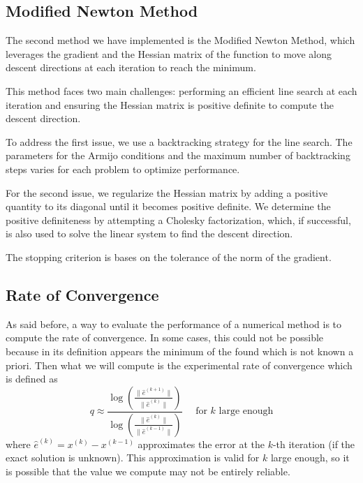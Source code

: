 \subsection*{Modified Newton Method}
The second method we have implemented is the Modified Newton Method, which leverages the gradient and the Hessian matrix of the function to move along descent directions at each iteration to reach the minimum.

This method faces two main challenges: performing an efficient line search at each iteration and ensuring the Hessian matrix is positive definite to compute the descent direction.

To address the first issue, we use a backtracking strategy for the line search. The parameters for the Armijo conditions and the maximum number of backtracking steps varies for each problem to optimize performance.

For the second issue, we regularize the Hessian matrix by adding a positive quantity to its diagonal until it becomes positive definite. We determine the positive definiteness by attempting a Cholesky factorization, which, if successful, is also used to solve the linear system to find the descent direction.

The stopping criterion is bases on the tolerance of the norm of the gradient.


\subsection*{Rate of Convergence}
As said before, a way to evaluate the performance of a numerical method is to compute the rate of convergence. In some cases, this could not be possible because in its definition appears the minimum of the found which is not known a priori.
Then what we will compute is the experimental rate of convergence which is defined as 
\begin{equation}
    q \approx \frac{ \log \left(\frac{\| \hat{e}^{(k+1)} \|}{\| \hat{e}^{(k)} \|} \right)}{ \log \left(\frac{\| \hat{e}^{(k)} \|}{\| \hat{e}^{(k-1)} \|} \right)}
    \quad \text{ for $k$ large enough}
    \label{definizione_roc}
\end{equation}
where $\hat{e}^{(k)} = x^{(k)} - x^{(k-1)}$ approximates the error at the $k$-th iteration (if the exact solution is unknown).
This approximation is valid for $k$ large enough, so it is possible that the value we compute may not be entirely reliable.
